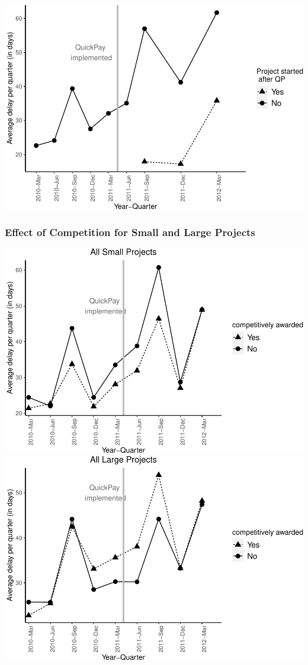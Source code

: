 \documentclass[
]{article}
\begin{document}
\includegraphics{qp_first_implementation_files/figure-latex/delays_plot_after_qp-1.pdf}

\hypertarget{effect-of-competition-for-small-and-large-projects}{%
\subsubsection{Effect of Competition for Small and Large
Projects}\label{effect-of-competition-for-small-and-large-projects}}

\includegraphics{qp_first_implementation_files/figure-latex/delays_plot_competition_and_size-1.pdf}
\includegraphics{qp_first_implementation_files/figure-latex/delays_plot_competition_and_size-2.pdf}
\end{document}
